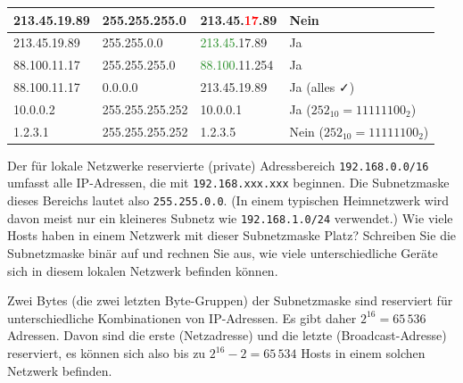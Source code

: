 \begin{myexercise}
\begin{myanswer}
\begin{table}[H]
\begin{tabular}{llll}
				213.45.19.89       & 255.255.255.0      & 213.45.\textcolor{red}{17}.89          & Nein                           \\\midrule

				213.45.19.89       & 255.255.0.0        & \textcolor{ForestGreen}{213.45}.17.89  & Ja                             \\\midrule

				88.100.11.17       & 255.255.255.0      & \textcolor{ForestGreen}{88.100}.11.254 & Ja                             \\\midrule

				88.100.11.17       & 0.0.0.0            & 213.45.19.89                           & Ja (alles \faCheck)            \\\midrule

				10.0.0.2           & 255.255.255.252    & 10.0.0.1                               & Ja ($252_{10}=11111100_{2}$)   \\\midrule
				1.2.3.1            & 255.255.255.252    & 1.2.3.5                                & Nein ($252_{10}=11111100_{2}$)
			\end{tabular}
		\end{table}
	\end{myanswer}
\end{myexercise}

\begin{myexercise}
	Der für lokale Netzwerke reservierte (private) Adressbereich \texttt{192.168.0.0/16} umfasst alle \gls{IP}-Adressen, die mit \texttt{192.168.xxx.xxx} beginnen. Die Subnetzmaske dieses Bereichs lautet also \texttt{255.255.0.0}. (In einem typischen Heimnetzwerk wird davon meist nur ein kleineres Subnetz wie \texttt{192.168.1.0/24} verwendet.) Wie viele Hosts haben in einem Netzwerk mit dieser Subnetzmaske Platz? Schreiben Sie die Subnetzmaske binär auf und rechnen Sie aus, wie viele unterschiedliche Geräte sich in diesem lokalen Netzwerk befinden können.
	\begin{myanswer}
		Zwei Bytes (die zwei letzten Byte-Gruppen) der Subnetzmaske sind reserviert für unterschiedliche Kombinationen von \gls{IP}-Adressen. Es gibt daher $2^{16} = 65\,536$ Adressen. Davon sind die erste (Netzadresse) und die letzte (Broadcast-Adresse) reserviert, es können sich also bis zu $2^{16} - 2 = 65\,534$ Hosts in einem solchen Netzwerk befinden.
	\end{myanswer}
\end{myexercise}

